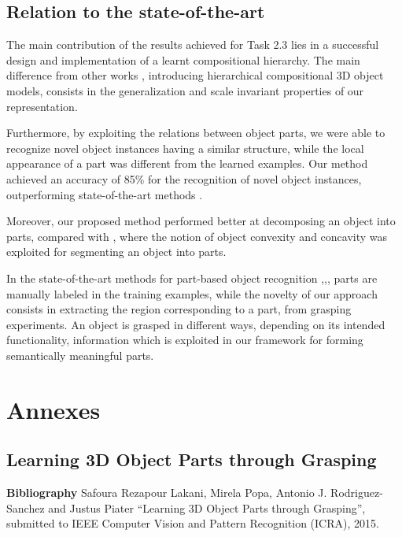 \documentclass[a4paper,11pt,pdf]{../templates/pacmanreport}
\begin{document}
\subsection{Relation to the state-of-the-art}

The main contribution of the results achieved for Task 2.3 lies in a successful design and implementation of a learnt compositional hierarchy. The main difference from other works \cite{rel2},\cite{comp2} introducing hierarchical compositional 3D object models, consists in the generalization and scale invariant properties of our representation. 

Furthermore, by exploiting the relations between object parts, we were able to recognize novel object instances having a similar structure, while the local appearance of a part was different from the learned examples. Our method achieved an accuracy of 85\% for the recognition of novel object instances, outperforming state-of-the-art methods \cite{vfh}. 

Moreover, our proposed method performed better at decomposing an object into parts, compared with \cite{rel7}, where the notion of object convexity and concavity was exploited for segmenting an object into parts.

In the state-of-the-art methods for part-based object recognition \cite{part2},\cite{part1},\cite{part3}, parts are manually labeled in the training examples, while the novelty of our approach consists in extracting the region corresponding to a part, from grasping experiments. An object is grasped in different ways, depending on its intended functionality, information which is exploited in our framework for forming semantically meaningful parts.

\newpage


	

\newpage 

\section{Annexes}
\label{ann}

\subsection{Learning 3D Object Parts through Grasping}
\label{ann:icra} 
\textbf{Bibliography} Safoura Rezapour Lakani, Mirela Popa, Antonio J. Rodriguez-Sanchez and Justus Piater “Learning 3D Object Parts through Grasping”, submitted to IEEE Computer Vision and Pattern Recognition (ICRA), 2015.
 
\end{document}
